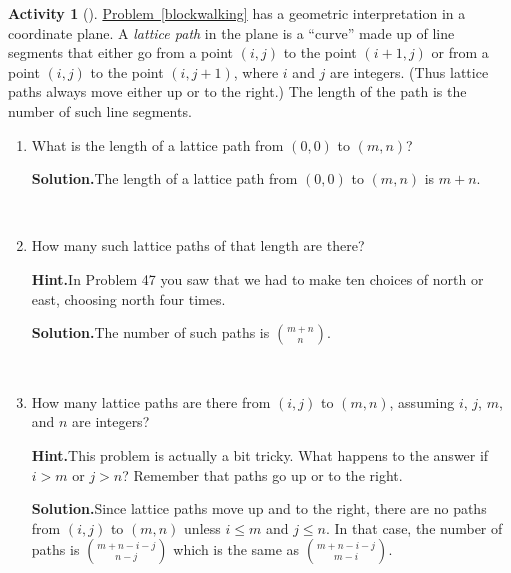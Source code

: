\documentclass[10pt,]{book}
\theoremstyle{plain}
\theoremstyle{definition}
\newtheorem{activity}[project]{Activity}
\numberwithin{equation}{chapter}
\newcommand{\gt}{>}
\begin{document}
\begin{activity}[]\label{latticepaths}
\hyperref[blockwalking]{Problem~\ref{blockwalking}} has a geometric interpretation in a coordinate plane. A \emph{lattice path} in the plane is a ``curve'' made up of line segments that either go from a point \((i,j)\) to the point \((i+1,j)\) or from a point \((i,j)\) to the point \((i,j+1)\), where \(i\) and \(j\) are integers. (Thus lattice paths always move either up or to the right.) The length of the path is the number of such line segments.%
~\par
\begin{enumerate}[label=(\alph*)]
 \item What is the length of a lattice path from \((0,0)\) to \((m,n)\)?%
\par\medskip\noindent%
\textbf{Solution.}\quad The length of a lattice path from \((0,0)\) to \((m,n)\) is \(m+n\).%

~\par
\item How many such lattice paths of that length are there?%
\par\medskip\noindent%
\textbf{Hint.}\quad In Problem 47 you saw that we had to make ten choices of north or east, choosing north four times.%
\par\medskip\noindent%
\textbf{Solution.}\quad The number of such paths is \(\binom{m+n}{n}\).%

~\par
\item How many lattice paths are there from \((i,j)\) to \((m,n)\), assuming \(i\), \(j\), \(m\), and \(n\) are integers?%
\par\medskip\noindent%
\textbf{Hint.}\quad This problem is actually a bit tricky. What happens to the answer if \(i \gt m\) or \(j \gt n\)? Remember that paths go up or to the right.%
\par\medskip\noindent%
\textbf{Solution.}\quad Since lattice paths move up and to the right, there are no paths from \((i,j)\) to \((m,n)\) unless \(i\le m\) and \(j\le n\). In that case, the number of paths is \(\binom{m+n-i-j}{n-j}\) which is the same as \(\binom{m+n-i-j}{m-i}\).%

\end{enumerate}
\end{activity}
\end{document}
